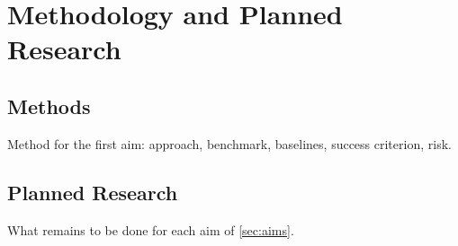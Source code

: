 \chapter{Methodology and Planned Research}
\label{ch:methodology}

\section{Methods}
\label{sec:methods}
Method for the first aim: approach, benchmark, baselines, success criterion, risk.

\section{Planned Research}
\label{sec:planned-research}
What remains to be done for each aim of \cref{sec:aims}.
